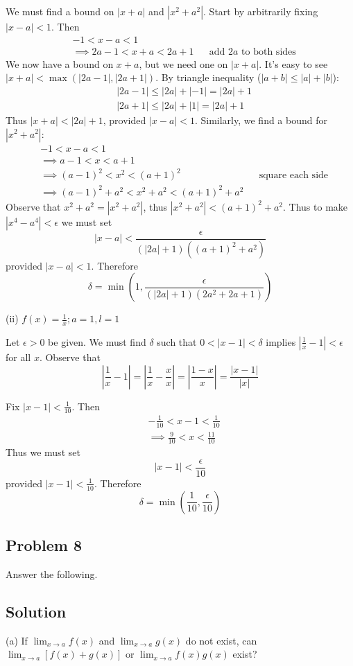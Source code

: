 We must find a bound on $|x+a|$ and $|x^2+a^2|$. Start by arbitrarily fixing $|x-a|<1$. Then
\begin{align*}
    &-1<x-a<1\\
    &\implies 2a-1<x+a<2a+1&&\text{add $2a$ to both sides}
\end{align*}
We now have a bound on $x+a$, but we need one on $|x+a|$. It's easy to see $|x+a|<\max(|2a-1|, |2a+1|)$. By triangle inequality ($|a+b|\leq|a|+|b|$):
\begin{align*}
    &|2a-1|\leq|2a|+|-1|=|2a|+1\\
    &|2a+1|\leq|2a|+|1|=|2a|+1
\end{align*}
Thus $|x+a|<|2a|+1$, provided $|x-a|<1$. Similarly, we find a bound for $|x^2+a^2|$:
\begin{align*}
    &-1<x-a<1\\
    &\implies a-1<x<a+1\\
    &\implies (a-1)^2<x^2<(a+1)^2&&\text{square each side}\\
    &\implies (a-1)^2+a^2<x^2+a^2<(a+1)^2+a^2
\end{align*}
Observe that $x^2+a^2=|x^2+a^2|$, thus $|x^2+a^2|<(a+1)^2+a^2$. Thus to make $|x^4-a^4|<\epsilon$ we must set
\[|x-a|<\frac{\epsilon}{(|2a|+1)((a+1)^2+a^2)}\]
provided $|x-a|<1$. Therefore
\[\delta=\min(1, \frac{\epsilon}{(|2a|+1)(2a^2+2a+1)})\]

\vs

(ii) $f(x)=\frac{1}{x}; a=1, l=1$

\vs

Let $\epsilon>0$ be given. We must find $\delta$ such that $0<|x-1|<\delta$ implies $|\frac{1}{x}-1|<\epsilon$ for all $x$. Observe that
\[\left|\frac{1}{x}-1\right|=\left|\frac{1}{x}-\frac{x}{x}\right|=\left|\frac{1-x}{x}\right|=\frac{|x-1|}{|x|}\]

Fix $|x-1|<\frac{1}{10}$. Then
\begin{align*}
    &-\frac{1}{10}<x-1<\frac{1}{10}\\
    &\implies \frac{9}{10}<x<\frac{11}{10}
\end{align*}
Thus we must set
\[|x-1|<\frac{\epsilon}{10}\] provided $|x-1|<\frac{1}{10}$. Therefore
\[\delta=\min(\frac{1}{10}, \frac{\epsilon}{10})\]

\subsection*{Problem 8}
Answer the following.

\subsection*{Solution}
(a) If $\lim_{x\to a}f(x)$ and $\lim_{x\to a}g(x)$ do not exist, can $\lim_{x\to a}[f(x)+g(x)]$ or $\lim_{x\to a}f(x)g(x)$ exist?

